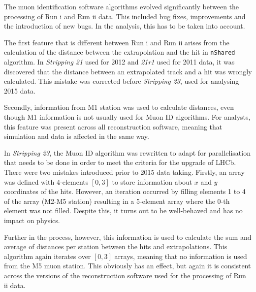 The muon identification software algorithms evolved significantly between the processing of Run \Rn{1} and Run \Rn{2} data. This included bug fixes, improvements and the introduction of new bugs. In the \Bmumumu analysis, this has to be taken into account.


The first feature that is different between Run \Rn{1} and Run \Rn{2} arises from the calculation of the distance between the extrapolation and the hit in \texttt{nShared} algorithm.
In \textit{Stripping 21} used for 2012 and \textit{21r1} used for 2011 data, it was discovered that the distance between an extrapolated track and a hit was wrongly calculated. This mistake was corrected before \textit{Stripping 23}, used for analysing 2015 data. 

Secondly, information from M1 station was used to calculate distances, even though M1 information is not usually used for Muon ID algorithms.  For analysts, this feature was present across all reconstruction software, meaning that simulation and data is affected in the same way.

In \textit{Stripping 23}, the Muon ID algorithm was rewritten to adapt for parallelisation that needs to be done in order to meet the criteria for the upgrade of \gls{LHCb}. There were two mistakes introduced prior to 2015 data taking.
Firstly, an array was defined with 4-elements $[0,3]$ to store information about $x$ and $y$ coordinates of the hits. However, an iteration occurred by filling elements 1 to 4 of the array (M2-M5 station) resulting in a 5-element array where the 0-th element was not filled. Despite this, it turns out to be well-behaved and has no impact on physics.

Further in the process, however, this information is used to calculate the sum and average of distances per station between the hits and extrapolations. This algorithm again iterates over $[0,3]$ arrays, meaning that no information is used from the M5 muon station. This obviously has an effect, but again it is consistent across the versions of the reconstruction software used for the processing of Run \Rn{2} data.

